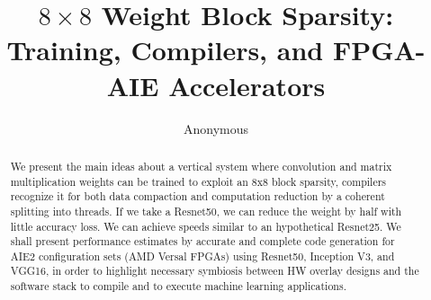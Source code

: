 \documentclass{IEEEtran}
\begin{document}
\title{$8\times 8$ Weight Block Sparsity: Training, Compilers, and FPGA-AIE
  Accelerators }


\author{Anonymous}



\maketitle


\begin{abstract}
We present the main ideas about a vertical system where convolution
and matrix multiplication weights can be trained to exploit an 8x8
block sparsity, compilers recognize it for both data compaction and
computation reduction by a coherent splitting into threads. If we take
a Resnet50, we can reduce the weight by half with little accuracy
loss. We can achieve speeds similar to an hypothetical Resnet25. We
shall present performance estimates by accurate and complete code
generation for AIE2 configuration sets (AMD Versal FPGAs) using
Resnet50, Inception V3, and VGG16, in order to highlight necessary
symbiosis between HW overlay designs and the software stack to compile
and to execute machine learning applications.
\end{abstract}

\end{document}
